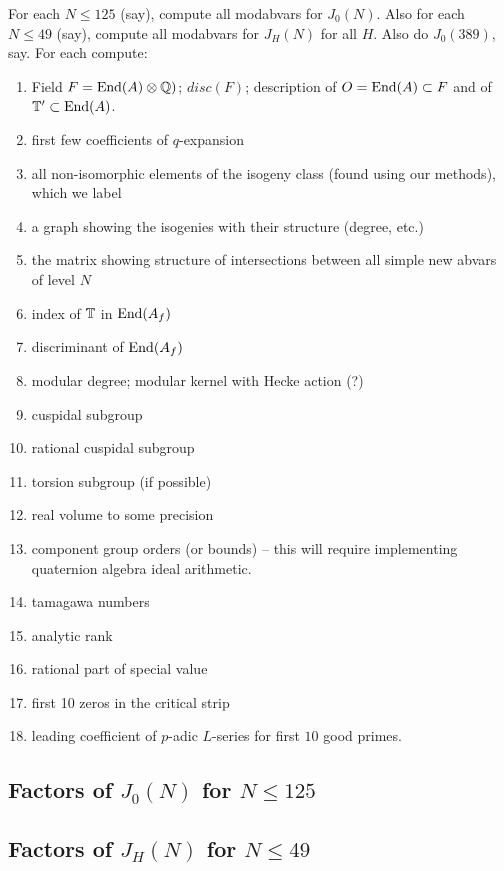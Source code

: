\documentclass{article}
\begin{document}
For each $N\leq 125$ (say), compute all modabvars for $J_0(N)$.
Also for each $N\leq 49$ (say), compute all modabvars for $J_H(N)$ for
all $H$.  Also do $J_0(389)$, say.
For each compute:
\begin{enumerate}
    \item Field $F = \operatorname{End}(A)\otimes \mathbb{Q})$; $disc(F)$; description of $O=\operatorname{End}(A) \subset F$ and of $\mathbb{T}'\subset \operatorname{End}(A)$.
    \item first few coefficients of $q$-expansion
    \item all non-isomorphic elements of the isogeny class (found using our methods),
        which we label
    \item a graph showing the isogenies with their structure (degree, etc.)
    \item the matrix showing structure of intersections between all simple new
        abvars of level $N$
    \item index of $\mathbb{T}$ in $\operatorname{End}(A_f)$
    \item discriminant of $\operatorname{End}(A_f)$
    \item modular degree; modular kernel with Hecke action (?)
    \item cuspidal subgroup
    \item rational cuspidal subgroup
    \item torsion subgroup (if possible)
    \item real volume to some precision
    \item component group orders (or bounds) -- this will require
        implementing quaternion algebra ideal arithmetic.
    \item tamagawa numbers
    \item analytic rank
    \item rational part of special value
    \item first 10 zeros in the critical strip
    \item leading coefficient of $p$-adic $L$-series
        for first $10$ good primes.
\end{enumerate}

\subsection{Factors of $J_0(N)$ for $N\leq 125$}

\subsection{Factors of $J_H(N)$ for $N\leq 49$}
\end{document}
